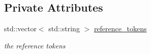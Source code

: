 \subsection*{Private Attributes}
\begin{DoxyCompactItemize}
\item 
\mbox{\label{classnlohmann_1_1json__pointer_a07a990a6838de4f38ee9d881e7b9fd61}} 
std\+::vector$<$ std\+::string $>$ \mbox{\hyperlink{classnlohmann_1_1json__pointer_a07a990a6838de4f38ee9d881e7b9fd61}{reference\+\_\+tokens}}
\begin{DoxyCompactList}\small\item\em the reference tokens \end{DoxyCompactList}\end{DoxyCompactItemize}
